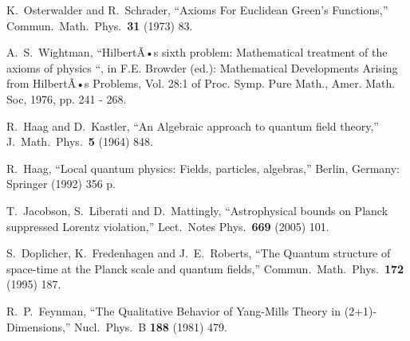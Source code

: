 \documentclass[letterpaper,11pt]{article}
\begin{document}
\begin{thebibliography}{99}
  K.~Osterwalder and R.~Schrader,
  ``Axioms For Euclidean Green's Functions,''
  Commun.\ Math.\ Phys.\  {\bf 31} (1973) 83.


A.~S.~Wightman,  ``HilbertÃ•s sixth problem: Mathematical treatment of the axioms of physics ``, in F.E. Browder (ed.): Mathematical Developments Arising from HilbertÃ•s Problems, Vol. 28:1 of Proc. Symp. Pure Math., Amer. Math. Soc, 1976, pp. 241 - 268.



  R.~Haag and D.~Kastler,
  ``An Algebraic approach to quantum field theory,''
  J.\ Math.\ Phys.\  {\bf 5} (1964) 848.


  R.~Haag,
  ``Local quantum physics: Fields, particles, algebras,''
  Berlin, Germany: Springer (1992) 356 p. 





  T.~Jacobson, S.~Liberati and D.~Mattingly,
  ``Astrophysical bounds on Planck suppressed Lorentz violation,''
  Lect.\ Notes Phys.\  {\bf 669} (2005) 101.






  S.~Doplicher, K.~Fredenhagen and J.~E.~Roberts,
  ``The Quantum structure of space-time at the Planck scale and quantum fields,''
  Commun.\ Math.\ Phys.\  {\bf 172} (1995) 187.






  R.~P.~Feynman,
  ``The Qualitative Behavior of Yang-Mills Theory in (2+1)-Dimensions,''
  Nucl.\ Phys.\ B {\bf 188} (1981) 479.


\end{thebibliography}
\end{document}
